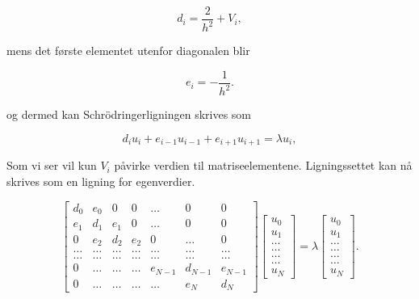 \documentclass[12pt]{article}
\begin{document}
\begin{equation*}
   d_i=\frac{2}{h^2}+V_i,
\end{equation*}

mens det første elementet utenfor diagonalen blir

\begin{equation*}
   e_i=-\frac{1}{h^2}.
\end{equation*}

og dermed kan Schrödringerligningen skrives som

\begin{equation*}
d_iu_i+e_{i-1}u_{i-1}+e_{i+1}u_{i+1}  = \lambda u_i,
\end{equation*}

Som vi ser vil kun $V_i$ påvirke verdien til matriseelementene.
Ligningssettet kan nå skrives som en ligning for egenverdier.

\begin{equation}
    \begin{bmatrix}
        d_0    & e_0   & 0     & 0      & \dots & 0     & 0 \\
        e_1    & d_1   & e_1   & 0      & \dots & 0     &0 \\
        0      & e_2   & d_2   & e_2    & 0     & \dots & 0\\
        \dots  & \dots & \dots & \dots  & \dots & \dots & \dots\\
        \dots  & \dots & \dots & \dots  & \dots & \dots & \dots\\
        0      & \dots & \dots & \dots  & e_{N-1}     &d_{N-1} & e_{N-1}\\
        0      & \dots & \dots & \dots  & \dots & e_{N} & d_{N}
    \end{bmatrix}
    \begin{bmatrix} 
        u_{0} \\ u_{1} \\ \dots\\ \dots\\ \dots\\ \dots\\ u_{N} 
    \end{bmatrix}
    =\lambda \begin{bmatrix} 
        u_{0} \\ u_{1} \\ \dots\\ \dots\\ \dots\\ \dots\\ u_{N}
    \end{bmatrix}.  
    \label{eq:sematrix}
\end{equation}
\end{document}
